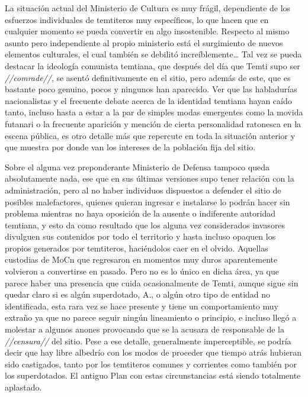 \documentclass[
  spanish,
]{book}
\begin{document}
La situación actual del Ministerio de Cultura es muy frágil, dependiente de los esfuerzos individuales de temtiteros muy específicos, lo que hacen que en cualquier momento se pueda convertir en algo insostenible. Respecto al mismo asunto pero independiente al propio ministerio está el surgimiento de nuevos elementos culturales, el cual también se debilitó increíblemente\ldots{} Tal vez se pueda destacar la ideología comunista temtiana, que después del día que Temti supo ser \emph{//comrade//}, se asentó definitivamente en el sitio, pero además de este, que es bastante poco genuino, pocos y ningunos han aparecido. Ver que las habladurías nacionalistas y el frecuente debate acerca de la identidad temtiana hayan caído tanto, incluso hasta a estar a la par de simples modas emergentes como la movida futanari o la frecuente aparición y mención de cierta personalidad ratonesca en la escena pública, es otro detalle más que repercute en toda la situación anterior y que muestra por donde van los intereses de la población fija del sitio.

Sobre el alguna vez preponderante Ministerio de Defensa tampoco queda absolutamente nada, ese que en sus últimas versiones supo tener relación con la administración, pero al no haber individuos dispuestos a defender el sitio de posibles malefactores, quienes quieran ingresar e instalarse lo podrán hacer sin problema mientras no haya oposición de la ausente o indiferente autoridad temtiana, y esto da como resultado que los alguna vez considerados invasores divulguen sus contenidos por todo el territorio y hasta incluso opaquen los propios generados por temtiteros, haciéndolos caer en el olvido.
Aquellas custodias de MoCn que regresaron en momentos muy duros aparentemente volvieron a convertirse en pasado. Pero no es lo único en dicha área, ya que parece haber una presencia que cuida ocasionalmente de Temti, aunque sigue sin quedar claro si es algún superdotado, A., o algún otro tipo de entidad no identificada, esta rara vez se hace presente y tiene un comportamiento muy extraño ya que no parece seguir ningún lineamiento o principio, e incluso llegó a molestar a algunos anones provocando que se la acusara de responsable de la \emph{//censura//} del sitio.
Pese a ese detalle, generalmente imperceptible, se podría decir que hay libre albedrío con los modos de proceder que tiempo atrás hubieran sido castigados, tanto por los temtiteros comunes y corrientes como también por los superdotados. El antiguo Plan con estas circunstancias está siendo totalmente aplastado.
\end{document}
